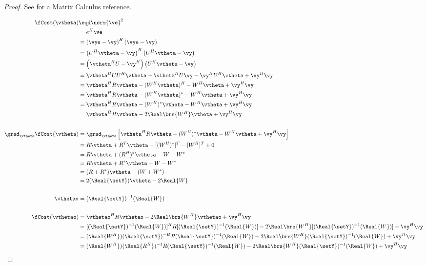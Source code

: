 \begin{proof}
See  for a Matrix Calculus reference.

\begin{align*}
   \fCost(\vtheta)
     &\eqd \norm{\ve}^2
   \\&=    e^H\ve
   \\&=    \left(\vye-\vy\right)^H\left(\vye-\vy\right)
   \\&=    \left(U^H\vtheta-\vy\right)^H\left(U^H\vtheta-\vy\right)
   \\&=    \left(\vtheta^HU-\vy^H\right)\left(U^H\vtheta-\vy\right)
   \\&=    \vtheta^HUU^H\vtheta - \vtheta^HU\vy -\vy^HU^H\vtheta + \vy^H\vy
   \\&=    \vtheta^H R \vtheta - (W^H\vtheta)^H -W^H\vtheta + \vy^H\vy
   \\&=    \vtheta^H R \vtheta - (W^H\vtheta)^\ast -W^H\vtheta + \vy^H\vy
   \\&=    \vtheta^H R \vtheta - (W^H)^\ast\vtheta -W^H\vtheta + \vy^H\vy
   \\&=    \vtheta^H R \vtheta - 2\Real\brs{W^H}\vtheta + \vy^H\vy
\\
\\
   \grad_\vtheta \fCost(\vtheta)
     &= \grad_\vtheta \left[ \vtheta^H R \vtheta - (W^H)^\ast\vtheta -W^H\vtheta + \vy^H\vy \right]
   \\&= R\vtheta + R^T\vtheta - [(W^H)^\ast]^T - [W^H]^T + 0
   \\&= R\vtheta + (R^H)^\ast\vtheta - W - W^\ast
   \\&= R\vtheta + R^\ast\vtheta - W - W^\ast
   \\&= (R + R^\ast)\vtheta - (W + W^\ast)
   \\&= 2(\Real{\setY})\vtheta - 2\Real{W}
\\
\\
   \vthetao
     &= (\Real{\setY})^{-1}(\Real{W})
\\
\\
   \fCost(\vthetao)
     &=    \vthetao^H R \vthetao - 2\Real\brs{W^H}\vthetao + \vy^H\vy
   \\&=    [(\Real{\setY})^{-1}(\Real{W})]^H R [(\Real{\setY})^{-1}(\Real{W})] - 2\Real\brs{W^H}[(\Real{\setY})^{-1}(\Real{W})] + \vy^H\vy
   \\&=    (\Real{W^H})(\Real{\setY})^{-H} R (\Real{\setY})^{-1}(\Real{W})     - 2\Real\brs{W^H}(\Real{\setY})^{-1}(\Real{W})       + \vy^H\vy
   \\&=    (\Real{W^H})(\Real{R^H})^{-1} R (\Real{\setY})^{-1}(\Real{W})   - 2\Real\brs{W^H}(\Real{\setY})^{-1}(\Real{W})     + \vy^H\vy

\end{align*}
\end{proof}
